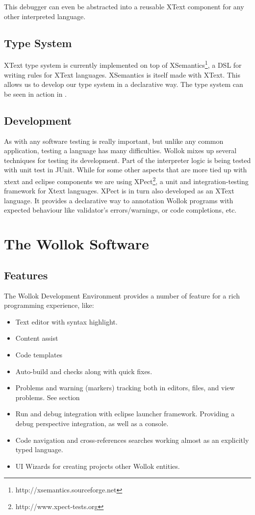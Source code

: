 This debugger can even be abstracted into a reusable XText component for any other interpreted language.

\subsection{Type System}

XText type system is currently implemented on top of XSemantics\footnote{http://xsemantics.sourceforge.net}, a DSL for writing rules for XText languages. XSemantics is itself made with XText.
This allows us to develop our type system in a declarative way. The type system can be seen in action in .

\subsection{Development}

As with any software testing is really important, but unlike any common application, testing a language has many difficulties.
Wollok mixes up several techniques for testing its development.
Part of the interpreter logic is being tested with unit test in JUnit. While for some other aspects that are more tied up with xtext and eclipse components we are using XPect\footnote{http://www.xpect-tests.org}, a unit and integration-testing framework for Xtext languages.
XPect is in turn also developed as an XText language.
It provides a declarative way to annotation Wollok programs with expected behaviour like validator’s errors/warnings, or code completions,  etc.

\section{The Wollok Software}

\subsection{Features}

The Wollok Development Environment provides a number of feature for a rich programming experience, like:

\begin{itemize}
 \item Text editor with syntax highlight.
 \item Content assist
 \item Code templates
 \item Auto-build and checks along with quick fixes.
 \item Problems and warning (markers) tracking both in editors, files, and view problems. See section 
 \item Run and debug integration with eclipse launcher framework. Providing a debug perspective integration, as well as a console.
 \item Code navigation and cross-references searches working almost as an explicitly typed language.
 \item UI Wizards for creating projects other Wollok entities.
\end{itemize}


